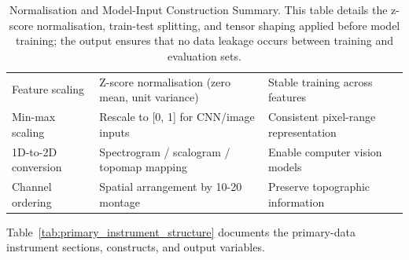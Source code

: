 {\tablestripes\tablefontsize
{}
\begin{xltabular}{\textwidth}{@{} l L L @{}}
\caption[Normalisation and Model-Input Construction Summary]{Normalisation and Model-Input Construction Summary. This table details the z-score normalisation, train-test splitting, and tensor shaping applied before model training; the output ensures that no data leakage occurs between training and evaluation sets.}\label{tab:normalization_summary} \\
\toprule
{} &  &  \\
\midrule
\endfirsthead
\endhead
\bottomrule
\endlastfoot
Feature scaling & Z-score normalisation (zero mean, unit variance) & Stable training across features \\
Min-max scaling & Rescale to [0, 1] for CNN/image inputs & Consistent pixel-range representation \\
1D-to-2D conversion & Spectrogram / scalogram / topomap mapping & Enable computer vision models \\
Channel ordering & Spatial arrangement by 10-20 montage & Preserve topographic information \\
\end{xltabular}}
\fi %

\noindent Table~\ref{tab:primary_instrument_structure} documents the primary-data instrument sections, constructs, and output variables.

\iffalse %

